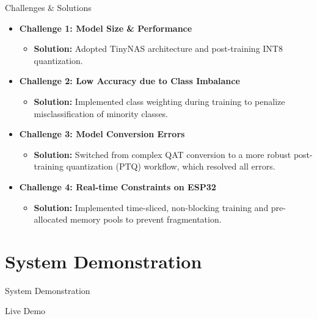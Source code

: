 \documentclass{beamer}
\begin{document}
\begin{frame}{Challenges & Solutions}
    \begin{itemize}
        \item \textbf{Challenge 1: Model Size \& Performance}
        \begin{itemize}
            \item \textbf{Solution:} Adopted TinyNAS architecture and post-training INT8 quantization.
        \end{itemize}
        \item \textbf{Challenge 2: Low Accuracy due to Class Imbalance}
        \begin{itemize}
            \item \textbf{Solution:} Implemented class weighting during training to penalize misclassification of minority classes.
        \end{itemize}
        \item \textbf{Challenge 3: Model Conversion Errors}
        \begin{itemize}
            \item \textbf{Solution:} Switched from complex QAT conversion to a more robust post-training quantization (PTQ) workflow, which resolved all errors.
        \end{itemize}
        \item \textbf{Challenge 4: Real-time Constraints on ESP32}
        \begin{itemize}
            \item \textbf{Solution:} Implemented time-sliced, non-blocking training and pre-allocated memory pools to prevent fragmentation.
        \end{itemize}
    \end{itemize}
\end{frame}

\section{System Demonstration}
\begin{frame}{System Demonstration}
    \begin{center}
        \Huge Live Demo
    \end{center}
\end{frame}

\end{document}
